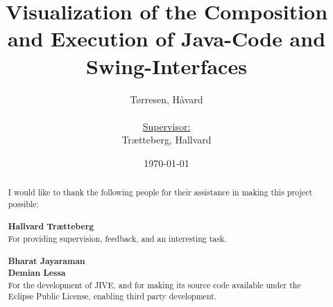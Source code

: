 \documentclass[pdftex,10pt,b5paper,twoside,openright]{report}
\title{
	Visualization of the Composition and Execution of Java-Code and Swing-Interfaces
}
\author{
	Tørresen, Håvard\\
	\\
	\underline{Supervisor:}\\
	Trætteberg, Hallvard
	\\
}
\date{\today}
\begin{document}
\begin{abstract}\label{abstract}
	\thispagestyle{plain}
	
\end{abstract}
\newpage
~
\newpage
\renewcommand{\abstractname}{Acknowledgements}
\begin{abstract}\label{acknowledgements}
	\thispagestyle{plain}
	\setcounter{page}{3}
I would like to thank the following people for their assistance in making this project  possible:\\
~\\
\textbf{Hallvard Trætteberg}\\
For providing supervision, feedback, and an interesting task.\\
~\\
\textbf{Bharat Jayaraman}\\
\textbf{Demian Lessa}\\
For the development of JIVE, and for making its source code available under the Eclipse Public License, enabling third party development.\\
\end{abstract}


\tableofcontents
\listoffigures
 \newpage
\thispagestyle{empty}
~
\newpage

\setlength{\parskip}{0em}












\glsunsetall
\printglossary
\printglossary[type=\acronymtype, style=superbold]

\newpage
\thispagestyle{empty}
~
\newpage


{}
{}



\appendix

\end{document}
